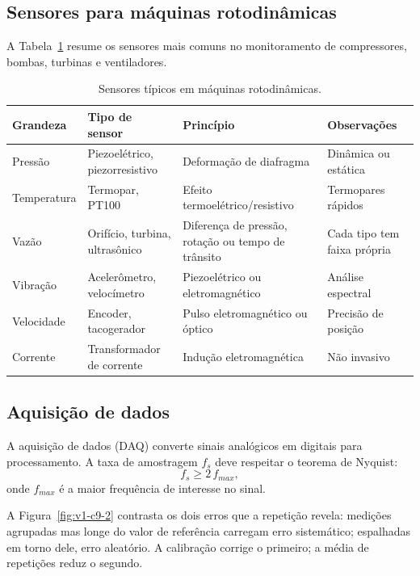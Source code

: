 \documentclass[12pt,a4paper]{article}
\numberwithin{equation}{section}
\numberwithin{table}{section}
\numberwithin{figure}{section}
\begin{document}
\subsection{Sensores para máquinas rotodinâmicas}

A Tabela~\ref{tab:v1-c9-1} resume os sensores mais comuns no monitoramento de
compressores, bombas, turbinas e ventiladores.

\begin{table}[H]
\centering
\caption{Sensores típicos em máquinas rotodinâmicas.}
\label{tab:v1-c9-1}
\small
\begin{tabular}{@{}p{2.0cm}p{3.0cm}p{4.0cm}p{4.2cm}@{}}
\toprule
\textbf{Grandeza} & \textbf{Tipo de sensor} & \textbf{Princípio} & \textbf{Observações} \\
\midrule
Pressão & Piezoelétrico, piezorresistivo & Deformação de diafragma & Dinâmica ou estática \\
Temperatura & Termopar, PT100 & Efeito termoelétrico/resistivo & Termopares rápidos \\
Vazão & Orifício, turbina, ultrasônico & Diferença de pressão, rotação ou tempo de trânsito & Cada tipo tem faixa própria \\
Vibração & Acelerômetro, velocímetro & Piezoelétrico ou eletromagnético & Análise espectral \\
Velocidade & Encoder, tacogerador & Pulso eletromagnético ou óptico & Precisão de posição \\
Corrente & Transformador de corrente & Indução eletromagnética & Não invasivo \\
\bottomrule
\end{tabular}
\end{table}

\subsection{Aquisição de dados}

A aquisição de dados (DAQ) converte sinais analógicos em digitais para
processamento. A taxa de amostragem $f_s$ deve respeitar o teorema de Nyquist:
\begin{equation}\label{eq:v1-c9-3}
f_s \geq 2\,f_{max},
\end{equation}
onde $f_{max}$ é a maior frequência de interesse no sinal.

A Figura~\ref{fig:v1-c9-2} contrasta os dois erros que a repetição revela:
medições agrupadas mas longe do valor de referência carregam erro
sistemático; espalhadas em torno dele, erro aleatório. A calibração corrige
o primeiro; a média de repetições reduz o segundo.
\end{document}
